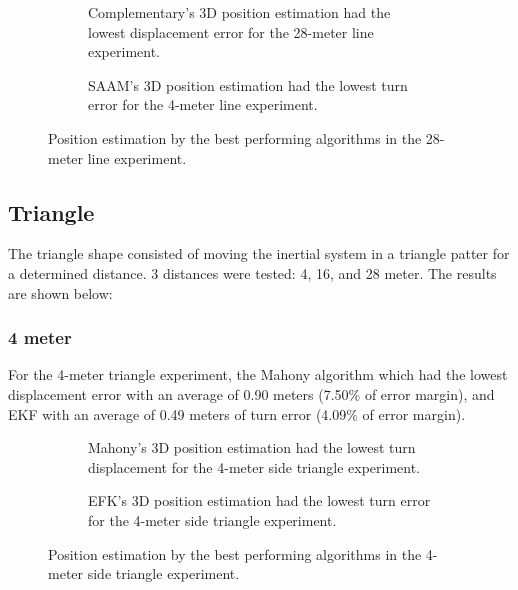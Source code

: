 \begin{figure}[H]
    \centering
    \begin{subfigure}{0.49\textwidth}
        \centering
        \resizebox{1\linewidth}{!}{}
        \caption{Complementary's 3D position estimation had the lowest displacement error for the 28-meter line experiment.}
        \label{fig:line28_2D}
    \end{subfigure}
    \begin{subfigure}{0.49\textwidth}
        \centering
        \resizebox{1\linewidth}{!}{}
        \caption{SAAM's 3D position estimation had the lowest turn error for the 4-meter line experiment.}
        \label{fig:line28_3D}
    \end{subfigure}
    \caption{Position estimation by the best performing algorithms in the 28-meter line experiment.}
    \label{fig:line28}
\end{figure}

\subsection{Triangle}

The triangle shape consisted of moving the inertial system in a triangle patter for a determined distance. 3 distances were tested: 4, 16, and 28 meter. The results are shown below:

\subsubsection{4 meter}

For the 4-meter triangle experiment, the Mahony algorithm which had the lowest displacement error with an average of 0.90  meters (7.50\% of error margin), and EKF with an average of 0.49 meters of turn error (4.09\% of error margin).

\vspace{-0.5cm}

\vspace{-1.5cm}

\begin{figure}[H]
    \centering
    \begin{subfigure}{0.49\textwidth}
        \centering
        \resizebox{1\linewidth}{!}{}
        \caption{Mahony's 3D position estimation had the lowest turn displacement for the 4-meter side triangle experiment.}
        \label{fig:triangle4_2D}
    \end{subfigure}
    \begin{subfigure}{0.49\textwidth}
        \centering
        \resizebox{1\linewidth}{!}{}
        \caption{EFK's 3D position estimation had the lowest turn error for the 4-meter side triangle experiment.}
        \label{fig:triangle4_3D}
    \end{subfigure}
    \caption{Position estimation by the best performing algorithms in the 4-meter side triangle experiment.}
    \label{fig:triangle4}
\end{figure}

